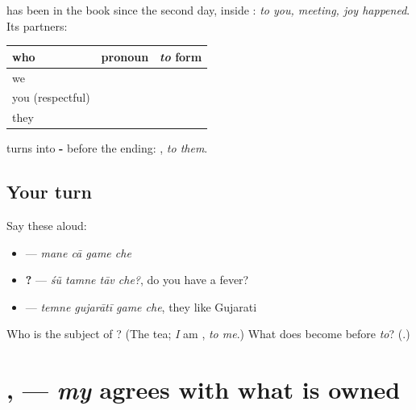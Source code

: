 \begin{grammarlens}[title={Grammar Lens: more than one}]
\textbf{} has been in the book since the second day, inside \textbf{   }: \emph{to you, meeting, joy happened}. Its partners:

\noindent
\begin{tabularx}{\linewidth}{@{}>{\raggedright\arraybackslash}X>{\raggedright\arraybackslash}X>{\raggedright\arraybackslash}X@{}}
\toprule
\textbf{who} & \textbf{pronoun} & \textbf{\emph{to} form} \\
\midrule
we & \gu{અમે} & \gu{અમને} \\
you (respectful) & \gu{તમે} & \gu{તમને} \\
they & \gu{તેઓ} & \gu{તેમને} \\
\bottomrule
\end{tabularx}

\textbf{} turns into \textbf{-} before the ending: \textbf{}, \emph{to them}.
\end{grammarlens}

\subsection*{Your turn}
Say these aloud:

\begin{itemize}
\raggedright
  \item \textbf{   } — \emph{mane cā game che}
  \item \textbf{   ?} — \emph{śũ tamne tāv che?}, do you have a fever?
  \item \textbf{   } — \emph{temne gujarātī game che}, they like Gujarati
\end{itemize}

\begin{tcolorbox}[breakable,colback=teal!4,colframe=teal!35!black,title={Before you move on}]
Who is the subject of \textbf{   }? (The tea; \emph{I} am \textbf{}, \emph{to me}.) What does \textbf{} become before \emph{to}? (\textbf{}.)
\end{tcolorbox}
\section[\texorpdfstring{\gu{મારો} · \gu{મારી} … (māro · mārī …)}{મારો · મારી … (māro · mārī …)}]{ ,   — \emph{my} agrees with what is owned}

